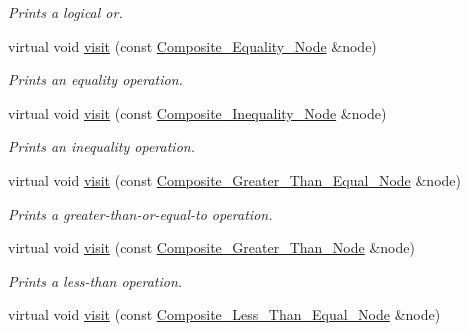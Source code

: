\begin{DoxyCompactItemize}
\begin{DoxyCompactList}\small\item\em Prints a logical or. \item\end{DoxyCompactList}\item 
virtual void \hyperlink{classMadara_1_1Expression__Tree_1_1Print__Visitor_a5f057afe2768e363c7591c529bef6024}{visit} (const \hyperlink{classMadara_1_1Expression__Tree_1_1Composite__Equality__Node}{Composite\_\-Equality\_\-Node} \&node)
\begin{DoxyCompactList}\small\item\em Prints an equality operation. \item\end{DoxyCompactList}\item 
virtual void \hyperlink{classMadara_1_1Expression__Tree_1_1Print__Visitor_a39190cbf3624c28ec61fb446fd86ecc5}{visit} (const \hyperlink{classMadara_1_1Expression__Tree_1_1Composite__Inequality__Node}{Composite\_\-Inequality\_\-Node} \&node)
\begin{DoxyCompactList}\small\item\em Prints an inequality operation. \item\end{DoxyCompactList}\item 
virtual void \hyperlink{classMadara_1_1Expression__Tree_1_1Print__Visitor_a68ac856171854ce9acd1542b1fe26954}{visit} (const \hyperlink{classMadara_1_1Expression__Tree_1_1Composite__Greater__Than__Equal__Node}{Composite\_\-Greater\_\-Than\_\-Equal\_\-Node} \&node)
\begin{DoxyCompactList}\small\item\em Prints a greater-\/than-\/or-\/equal-\/to operation. \item\end{DoxyCompactList}\item 
virtual void \hyperlink{classMadara_1_1Expression__Tree_1_1Print__Visitor_a8430656938fed043fcb45622911b2a57}{visit} (const \hyperlink{classMadara_1_1Expression__Tree_1_1Composite__Greater__Than__Node}{Composite\_\-Greater\_\-Than\_\-Node} \&node)
\begin{DoxyCompactList}\small\item\em Prints a less-\/than operation. \item\end{DoxyCompactList}\item 
virtual void \hyperlink{classMadara_1_1Expression__Tree_1_1Print__Visitor_a932f6bab556f819c6d8c398f70b4a5c2}{visit} (const \hyperlink{classMadara_1_1Expression__Tree_1_1Composite__Less__Than__Equal__Node}{Composite\_\-Less\_\-Than\_\-Equal\_\-Node} \&node)

\end{DoxyCompactItemize}
